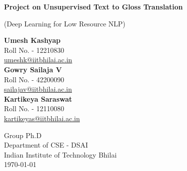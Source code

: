 \begin{titlepage}
	\begin{center}
		\vspace*{1cm}
		
		\Huge
		\textbf{Project on Unsupervised Text to Gloss Translation}	
		
		
		\vspace{0.3cm}
		\LARGE
		 (Deep Learning for Low Resource NLP)
		\vspace{1.3cm}
		
		
		\vspace{2.3cm}
  
		\textbf{Umesh Kashyap} \\
		\vspace{0.2cm}
		{Roll No. - 12210830} \\
            \href{mailto:xxx@iitbhilai.ac.in}{umeshk@iitbhilai.ac.in} \\
	
		
		\textbf{Gowry Sailaja V} \\
		\vspace{0.2cm}
		{Roll No. - 42200090} \\
            \href{mailto:xxx@iitbhilai.ac.in}{sailajav@iitbhilai.ac.in} \\
		
		\vspace{0.2cm}
            \textbf{Kartikeya Saraswat} \\
		\vspace{0.2cm}
		{Roll No. - 12110080} \\
            \href{mailto:xxx@iitbhilai.ac.in}{kartikeyas@iitbhilai.ac.in} \\
		
		\vspace{0.2cm}
  
		\vspace{0.2cm}
		
		\vspace{2.4cm}	
            Group Ph.D \\ 
		Department of CSE - DSAI \\
		\vspace{0.2cm}
		Indian Institute of Technology Bhilai \\
		
		\vspace{0.2cm} 		
		\today
		
	\end{center}
\end{titlepage}